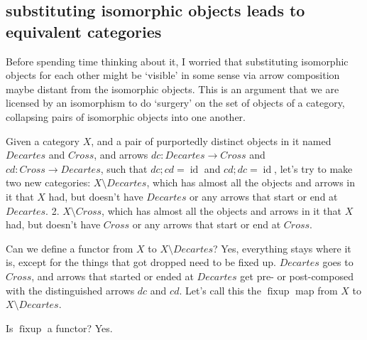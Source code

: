 \documentclass{proc-l}
\theoremstyle{definition}
\theoremstyle{remark}
\numberwithin{equation}{section}
\begin{document}
\subsection{substituting isomorphic objects leads to equivalent categories}

Before spending time thinking about it, I worried that substituting isomorphic objects for each other
might be `visible' in some sense via arrow composition maybe distant from the isomorphic objects. This is
an argument that we are licensed by an isomorphism to do `surgery' on the set of objects of a category,
collapsing pairs of isomorphic objects into one another.

Given a category \(X\), and a pair of purportedly distinct objects in it named \(Decartes\) and \(Cross\),
and arrows \(dc: Decartes \to Cross\) and \(cd: Cross \to Decartes\), 
such that \(dc; cd = \operatorname{id}\) and \(cd; dc = \operatorname{id}\), let's try to make two new categories:
\(X \setminus Decartes\), which has almost all the objects and arrows in it that \(X\) had,
but doesn't have \(Decartes\) or any arrows that start or end at \(Decartes\).
2. \(X \setminus Cross\), which has almost all the objects and arrows in it that \(X\) had,
but doesn't have \(Cross\) or any arrows that start or end at \(Cross\).

Can we define a functor from \(X\) to \(X \setminus Decartes\)?
Yes, everything stays where it is, except for the things that got dropped need to be fixed up.
\(Decartes\) goes to \(Cross\), and arrows that started or ended at \(Decartes\) get pre- or post-composed with
the distinguished arrows \(dc\) and \(cd\).
Let's call this the \(\operatorname{fixup}\) map from \(X\) to \(X \setminus Decartes\).

Is \(\operatorname{fixup}\) a functor? Yes.
\end{document}
